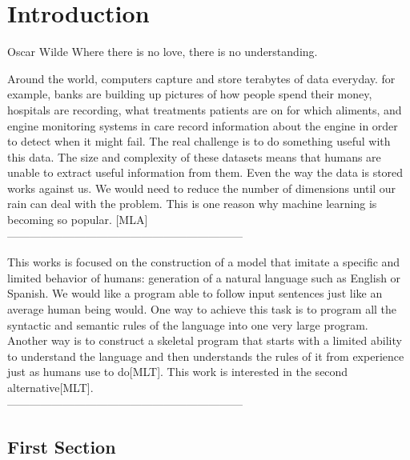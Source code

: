 \chapter{Introduction}
\label{ch:intro}

\begin{chapterquote}{Oscar Wilde}
	Where there is no love, there is no understanding.
\end{chapterquote}
Around the world, computers capture and store terabytes of data everyday. for example, banks are building up pictures of how people spend their money, hospitals are recording, what treatments patients are on for which aliments, and engine monitoring systems in care record information about the engine in order to detect when it might fail. The real challenge is to do something useful with this data. 
The size and complexity of these datasets means that humans are unable to extract useful information from them. Even the way the data is stored works against us. We would need to reduce the number of dimensions until our rain can deal with the problem. 
This is one reason why machine learning is becoming so popular.
[MLA]\\
---------------------------------------------------------------


This works is focused on the construction of a model that imitate a specific and limited behavior of humans: generation of a natural language such as English or Spanish. We would like a program able to follow input sentences just like an average human being would. One way to achieve this task is to program all the syntactic and semantic rules of the language into one very large program. Another way is to construct a skeletal program that starts with a limited ability to understand the language and then understands the rules of it from experience just as humans use to do[MLT]. This work is interested in the second alternative[MLT].\\
---------------------------------------------------------------



\section{First Section}